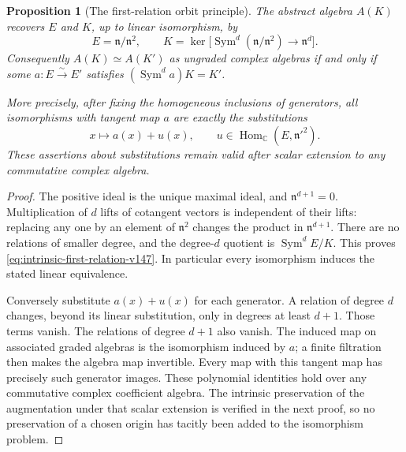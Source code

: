 \documentclass[11pt,reqno]{amsart}
\numberwithin{equation}{section}
\newtheorem{proposition}[theorem]{Proposition}
\theoremstyle{definition}\newtheorem{definition}[theorem]{Definition}
\theoremstyle{remark}\newtheorem{remark}[theorem]{Remark}
\newcommand{\C}{\mathbb C}\newcommand{\Q}{\mathbb Q}
\DeclareMathOperator{\Sym}{Sym}\DeclareMathOperator{\Gr}{Gr}
\DeclareMathOperator{\Hom}{Hom}\DeclareMathOperator{\Tot}{Tot}
\begin{document}
\begin{proposition}[The first-relation orbit principle]
\label{prop:first-relation-orbit-v147}
The abstract algebra \(A(K)\) recovers \(E\) and \(K\), up to
linear isomorphism, by
\begin{equation}\label{eq:intrinsic-first-relation-v147}
 E=\mathfrak n/\mathfrak n^2,\qquad
 K=\ker\bigl[\Sym^d(\mathfrak n/\mathfrak n^2)
                                    \longrightarrow\mathfrak n^d\bigr].
\end{equation}
Consequently \(A(K)\simeq A(K')\) as ungraded complex algebras
if and only if some \(a:E\xrightarrow{\sim}E'\) satisfies
\((\Sym^d a)K=K'\).

More precisely, after fixing the homogeneous inclusions of generators,
all isomorphisms with tangent map \(a\) are exactly the substitutions
\[
                 x\longmapsto a(x)+u(x),\qquad
                 u\in\Hom_{\C}(E,\mathfrak n'^2).
\]
These assertions about substitutions remain valid after scalar
extension to any commutative complex algebra.
\end{proposition}
\begin{proof}
The positive ideal is the unique maximal ideal, and
\(\mathfrak n^{d+1}=0\).  Multiplication of \(d\) lifts of
cotangent vectors is independent of their lifts: replacing any one
by an element of \(\mathfrak n^2\) changes the product in
\(\mathfrak n^{d+1}\).  There are no relations of smaller degree,
and the degree-\(d\) quotient is \(\Sym^d E/K\).  This proves
\eqref{eq:intrinsic-first-relation-v147}.  In particular every
isomorphism induces the stated linear equivalence.

Conversely substitute \(a(x)+u(x)\) for each generator.  A relation
of degree \(d\) changes, beyond its linear substitution, only in
degrees at least \(d+1\).  Those terms vanish.  The relations of
degree \(d+1\) also vanish.  The induced map on associated graded
algebras is the isomorphism induced by \(a\); a finite filtration
then makes the algebra map invertible.  Every map with this tangent
map has precisely such generator images.  These polynomial identities
hold over any commutative complex coefficient algebra.  The intrinsic
preservation of the augmentation under that scalar extension is
verified in the next proof, so no preservation of a chosen origin has
tacitly been added to the isomorphism problem.
\end{proof}
\end{document}
